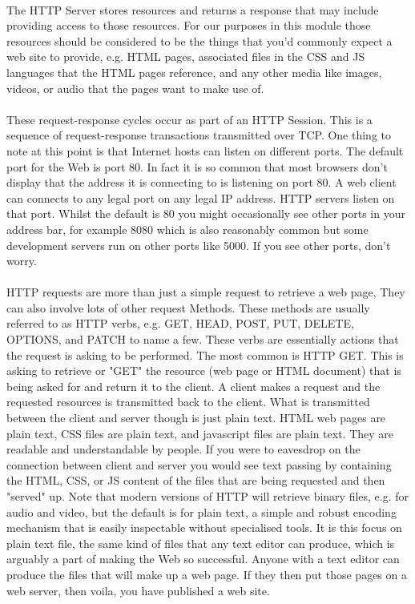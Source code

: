 \documentclass[12pt, a4paper, oneside]{book}
\begin{document}
\paragraph{} The HTTP Server stores resources and returns a response that may include providing access to those resources. For our purposes in this module those resources should be considered to be the things that you'd commonly expect a web site to provide, e.g. HTML pages, associated files in the CSS and JS languages that the HTML pages reference, and any other media like images, videos, or audio that the pages want to make use of.
\paragraph{} These request-response cycles occur as part of an HTTP Session. This is a sequence of request-response transactions transmitted over TCP.  One thing to note at this point is that Internet hosts can listen on different ports. The default port for the Web is port 80. In fact it is so common that most browsers don't display that the address it is connecting to is listening on port 80. A web client can connects to any legal port on any legal IP address. HTTP servers listen on that port. Whilst the default is 80 you might occasionally see other ports in your address bar, for example 8080 which is also reasonably common but some development servers run on other ports like 5000. If you see other ports, don't worry. 
\paragraph{} HTTP requests are more than just a simple request to retrieve a web page, They can also involve lots of other request Methods. These methods are usually referred to as  HTTP verbs, e.g. GET, HEAD, POST, PUT, DELETE, OPTIONS, and PATCH to name a few. These verbs are essentially actions that the request is asking to be performed. The most common is HTTP GET. This is asking to retrieve or "GET" the resource (web page or HTML document) that is being asked for and return it to the client. A client makes a request and the requested resources is transmitted back to the client. What is transmitted between the client and server though is just plain text. HTML web pages are plain text, CSS files are plain text, and javascript files are plain text. They are readable and understandable by people. If you were to eavesdrop on the connection between client and server you would see text passing by containing the HTML, CSS, or JS content of the files that are being requested and then "served" up. Note that modern versions of HTTP will retrieve binary files, e.g. for audio and video, but the default is for plain text, a simple and robust encoding mechanism that is easily inspectable without specialised tools. It is this focus on plain text file, the same kind of files that any text editor can produce, which is arguably a part of making the Web so successful. Anyone with a text editor can produce the files that will make up a web page. If they then put those pages on a web server, then voila, you have published a web site.
\end{document}
